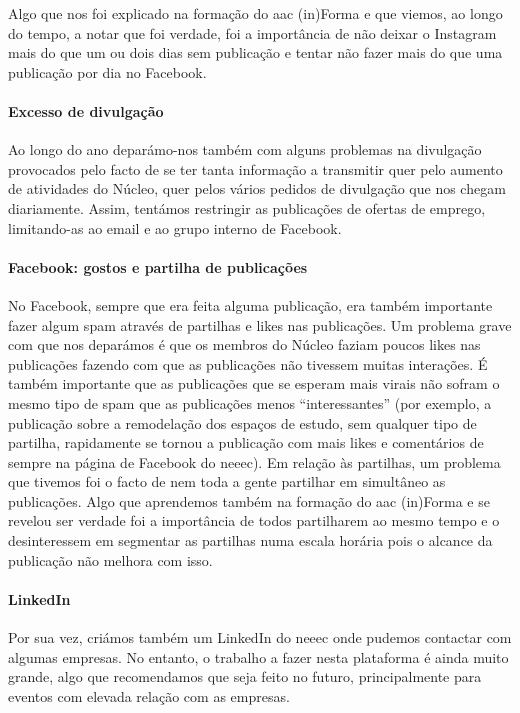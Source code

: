 Algo que nos foi explicado na formação do \acrshort{aac} (in)Forma e que viemos, ao longo do tempo, a notar que foi verdade, foi a importância de não deixar o Instagram mais do que um ou dois dias sem publicação e tentar não fazer mais do que uma publicação por dia no Facebook.

\paragraph{Excesso de divulgação}
Ao longo do ano deparámo-nos também com alguns problemas na divulgação provocados pelo facto de se ter tanta informação a transmitir quer pelo aumento de atividades do Núcleo, quer pelos vários pedidos de divulgação que nos chegam diariamente. Assim, tentámos restringir as publicações de ofertas de emprego, limitando-as ao email e ao grupo interno de Facebook.

\paragraph{Facebook: gostos e partilha de publicações}
No Facebook, sempre que era feita alguma publicação, era também importante fazer algum spam através de partilhas e likes nas publicações. Um problema grave com que nos deparámos é que os membros do Núcleo faziam poucos likes nas publicações fazendo com que as publicações não tivessem muitas interações. É também importante que as publicações que se esperam mais virais não sofram o mesmo tipo de spam que as publicações menos “interessantes” (por exemplo, a publicação sobre a remodelação dos espaços de estudo, sem qualquer tipo de partilha, rapidamente se tornou a publicação com mais likes e comentários de sempre na página de Facebook do \acrshort{neeec}). Em relação às partilhas, um problema que tivemos foi o facto de nem toda a gente partilhar em simultâneo as publicações. Algo que aprendemos também na formação do \acrshort{aac} (in)Forma e se revelou ser verdade foi a importância de todos partilharem ao mesmo tempo e o desinteressem em segmentar as partilhas numa escala horária pois o alcance da publicação não melhora com isso.

\paragraph{LinkedIn}
Por sua vez, criámos também um LinkedIn do \acrshort{neeec} onde pudemos contactar com algumas empresas. No entanto, o trabalho a fazer nesta plataforma é ainda muito grande, algo que recomendamos que seja feito no futuro, principalmente para eventos com elevada relação com as empresas.

